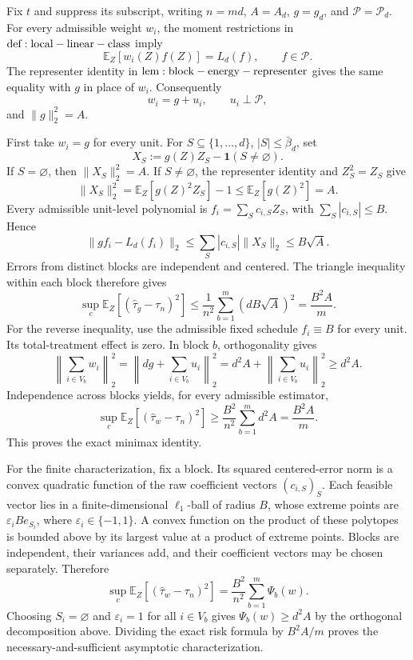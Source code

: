 Fix \(t\) and suppress its subscript, writing \(n=md\), \(A=A_d\), \(g=g_d\), and \(\mathcal P=\mathcal P_d\). For every admissible weight \(w_i\), the moment restrictions in \({\rm def:local-linear-class}\) imply
\[
\mathbb E_Z[w_i(Z)f(Z)]=L_d(f),\qquad f\in\mathcal P.
\]
The representer identity in \({\rm lem:block-energy-representer}\) gives the same equality with \(g\) in place of \(w_i\). Consequently
\[
w_i=g+u_i,\qquad u_i\perp\mathcal P,
\]
and \(\|g\|_2^2=A\).

First take \(w_i=g\) for every unit. For \(S\subseteq\{1,\ldots,d\}\), \(|S|\le\bar\beta_d\), set
\[
X_S:=g(Z)Z_S-\mathbf1(S\ne\varnothing).
\]
If \(S=\varnothing\), then \(\|X_S\|_2^2=A\). If \(S\ne\varnothing\), the representer identity and \(Z_S^2=Z_S\) give
\[
\|X_S\|_2^2=\mathbb E_Z[g(Z)^2Z_S]-1\le\mathbb E_Z[g(Z)^2]=A.
\]
Every admissible unit-level polynomial is \(f_i=\sum_Sc_{i,S}Z_S\), with \(\sum_S|c_{i,S}|\le B\). Hence
\[
\|gf_i-L_d(f_i)\|_2
\le\sum_S|c_{i,S}|\|X_S\|_2\le B\sqrt A.
\]
Errors from distinct blocks are independent and centered. The triangle inequality within each block therefore gives
\[
\sup_c\mathbb E_Z[(\widehat\tau_g-\tau_n)^2]
\le\frac{1}{n^2}\sum_{b=1}^{m}(dB\sqrt A)^2
=\frac{B^2A}{m}.
\]
For the reverse inequality, use the admissible fixed schedule \(f_i\equiv B\) for every unit. Its total-treatment effect is zero. In block \(b\), orthogonality gives
\[
\left\|\sum_{i\in V_b}w_i\right\|_2^2
=\left\|dg+\sum_{i\in V_b}u_i\right\|_2^2
=d^2A+\left\|\sum_{i\in V_b}u_i\right\|_2^2
\ge d^2A.
\]
Independence across blocks yields, for every admissible estimator,
\[
\sup_c\mathbb E_Z[(\widehat\tau_w-\tau_n)^2]
\ge\frac{B^2}{n^2}\sum_{b=1}^{m}d^2A
=\frac{B^2A}{m}.
\]
This proves the exact minimax identity.

For the finite characterization, fix a block. Its squared centered-error norm is a convex quadratic function of the raw coefficient vectors \((c_{i,S})_S\). Each feasible vector lies in a finite-dimensional \(\ell_1\)-ball of radius \(B\), whose extreme points are \(\varepsilon_iBe_{S_i}\), where \(\varepsilon_i\in\{-1,1\}\). A convex function on the product of these polytopes is bounded above by its largest value at a product of extreme points. Blocks are independent, their variances add, and their coefficient vectors may be chosen separately. Therefore
\[
\sup_c\mathbb E_Z[(\widehat\tau_w-\tau_n)^2]
=\frac{B^2}{n^2}\sum_{b=1}^{m}\Psi_b(w).
\]
Choosing \(S_i=\varnothing\) and \(\varepsilon_i=1\) for all \(i\in V_b\) gives \(\Psi_b(w)\ge d^2A\) by the orthogonal decomposition above. Dividing the exact risk formula by \(B^2A/m\) proves the necessary-and-sufficient asymptotic characterization.

